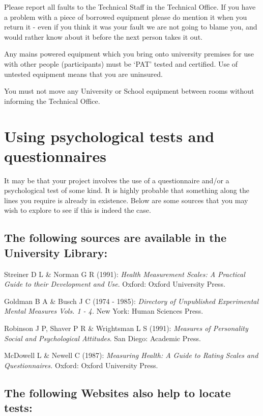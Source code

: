\documentclass[
]{book}
\begin{document}
Please report all faults to the Technical Staff in the Technical Office. If you have a problem with a piece of borrowed equipment please do mention it when you return it - even if you think it was your fault we are not going to blame you, and would rather know about it before the next person takes it out.

Any mains powered equipment which you bring onto university premises for use with other people (participants) must be `PAT' tested and certified. Use of untested equipment means that you are uninsured.

You must not move any University or School equipment between rooms without informing the Technical Office.

\chapter{Using psychological tests and questionnaires}\label{using-psychological-tests-and-questionnaires}

It may be that your project involves the use of a questionnaire and/or a psychological test of some kind. It is highly probable that something along the lines you require is already in existence. Below are some sources that you may wish to explore to see if this is indeed the case.

\section{The following sources are available in the University Library:}\label{the-following-sources-are-available-in-the-university-library}

Streiner D L \& Norman G R (1991): \emph{Health Measurement Scales: A Practical Guide to their Development and Use}. Oxford: Oxford University Press.

Goldman B A \& Busch J C (1974 - 1985): \emph{Directory of Unpublished Experimental Mental Measures Vols. 1 - 4.} New York: Human Sciences Press.

Robinson J P, Shaver P R \& Wrightsman L S (1991): \emph{Measures of Personality Social and Psychological Attitudes}. San Diego: Academic Press.

McDowell L \& Newell C (1987): \emph{Measuring Health: A Guide to Rating Scales and Questionnaires.} Oxford: Oxford University Press.

\section{The following Websites also help to locate tests:}\label{the-following-websites-also-help-to-locate-tests}
\end{document}
